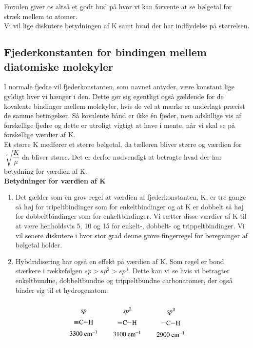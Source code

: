 Formlen giver os altså et godt bud på hvor vi kan forvente at se bølgetal for stræk mellem to atomer.
\\


Vi vil lige diskutere betydningen af K samt hvad der har indflydelse på størrelsen. 
\subsection{Fjederkonstanten for bindingen mellem diatomiske molekyler}

I normale fjedre vil fjederkonstanten, som navnet antyder, være konstant lige gyldigt hver vi hænger i den. Dette gør sig egentligt også gældende for de kovalente bindinger mellem molekyler, hvis de vel at mærke er underlagt præcist de samme betingelser. Så kovalente bånd er ikke én fjeder, men adskillige vis af forskellige fjedre og dette er utroligt vigtigt at have i mente, når vi skal se på forskellige værdier af K.
\\

Et større K medfører et større bølgetal, da tælleren bliver større og værdien for $\sqrt[2]{\dfrac{K}{\mu}}$ da bliver større. Det er derfor nødvendigt at betragte hvad der har betydning for værdien af K. 
\\
\textbf{Betydninger for værdien af K}
\begin{enumerate}
\item Det gælder som en grov regel at værdien af fjederkonstanten, K, er tre gange så høj for tripeltbindinger som for enkeltbindinger og at K er dobbelt så høj for dobbeltbindinger som for enkeltbindinger. Vi sætter disse værdier af K til at være henholdsvis 5, 10 og 15 for enkelt-, dobbelt- og trippeltbindinger. Vi vil senere diskutere i hvor stor grad denne grove fingerregel for beregninger af bølgetal holder.

\item Hybdridisering har også en effekt på værdien af K. Som regel er bond stærkere i rækkefølgen $sp > sp^2 > sp^3$. Dette kan vi se hvis vi betragter enkeltbundne, dobbeltbundne og trippeltbundne carbonatomer, der også binder sig til et hydrogenatom:

\begin{center}
\includegraphics[scale=1]{Billeder/sp}
\end{center}


\end{enumerate}

